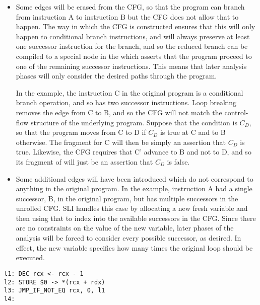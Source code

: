 \documentclass[12pt,a4paper]{book}
\begin{document}
\begin{itemize}
\item
  Some edges will be erased from the CFG, so that the program can branch from instruction A to instruction B but the CFG does not allow that to happen.
  The way in which the CFG is constructed ensures that this will only happen to conditional branch instructions, and will always preserve at least one successor instruction for the branch, and so the reduced branch can be compiled to a special  node in the \StateMachine which asserts that the program proceed to one of the remaining successor instructions.
  This means that later analysis phases will only consider the desired paths through the program.

  In the example, the instruction C in the original program is a conditional branch operation, and so has two successor instructions.
  Loop breaking removes the edge from C to B, and so the CFG will not match the control-flow structure of the underlying program.
  Suppose that the condition is $C_D$, so that the program moves from C to D if $C_D$ is true at C and to B otherwise.
  The \StateMachine fragment for C will then be simply an assertion that $C_D$ is true.
  Likewise, the CFG requires that C' advance to B and not to D, and so its fragment of \StateMachine will just be an assertion that $C_D$ is false.

\item
  Some additional edges will have been introduced which do not correspond to anything in the original program.
  In the example, instruction A had a single successor, B, in the original program, but has multiple successors in the unrolled CFG.
  SLI handles this case by allocating a new fresh variable and then using that to index into the available successors in the CFG.
  Since there are no constraints on the value of the new variable, later phases of the analysis will be forced to consider every possible successor, as desired.
  In effect, the new variable specifies how many times the original loop should be executed.
\end{itemize}



\begin{verbatim}
l1: DEC rcx <- rcx - 1
l2: STORE $0 -> *(rcx + rdx)
l3: JMP_IF_NOT_EQ rcx, 0, l1
l4:
\end{verbatim}
\end{document}
